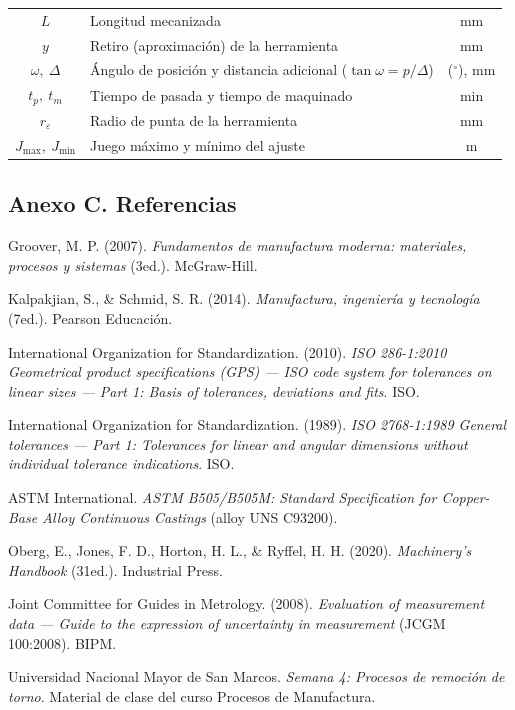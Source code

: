 \documentclass[12pt,a4paper]{article}
\begin{document}
\begin{table}[!htb]
\begin{tabularx}{\linewidth}{c X c}
		$L$                   & Longitud mecanizada                                              & mm             \\
		$y$                   & Retiro (aproximación) de la herramienta                          & mm             \\
		$\omega,\ \Delta$     & Ángulo de posición y distancia adicional ($\tan\omega=p/\Delta$) & ($^\circ$), mm \\
		$t_p,\ t_m$           & Tiempo de pasada y tiempo de maquinado                           & min            \\
		$r_\varepsilon$       & Radio de punta de la herramienta                                 & mm             \\
		$J_{\max},\ J_{\min}$ & Juego máximo y mínimo del ajuste                                 & \textmu m      \\
	\end{tabularx}
\end{table}

\subsection*{Anexo C. Referencias}

\begin{enumerate}[label={[\arabic*]},ref=\arabic*,leftmargin=2.2em,itemsep=5pt]
	\item\label{bib:groover} Groover, M. P. (2007). \emph{Fundamentos de manufactura moderna:
		      materiales, procesos y sistemas} (3\textdegree ed.). McGraw-Hill.
	\item\label{bib:kalpakjian} Kalpakjian, S., \& Schmid, S. R. (2014). \emph{Manufactura, ingeniería y
		      tecnología} (7\textdegree ed.). Pearson Educación.
	\item\label{bib:iso286} International Organization for Standardization. (2010). \emph{ISO 286-1:2010
		      Geometrical product specifications (GPS) --- ISO code system for tolerances on linear sizes
		      --- Part 1: Basis of tolerances, deviations and fits}. ISO.
	\item\label{bib:iso2768} International Organization for Standardization. (1989). \emph{ISO 2768-1:1989
		      General tolerances --- Part 1: Tolerances for linear and angular dimensions without
		      individual tolerance indications}. ISO.
	\item\label{bib:astm} ASTM International. \emph{ASTM B505/B505M: Standard Specification for
		      Copper-Base Alloy Continuous Castings} (alloy UNS C93200).
	\item\label{bib:oberg} Oberg, E., Jones, F. D., Horton, H. L., \& Ryffel, H. H. (2020).
	      \emph{Machinery's Handbook} (31\textdegree ed.). Industrial Press.
	\item\label{bib:gum} Joint Committee for Guides in Metrology. (2008). \emph{Evaluation of
		      measurement data --- Guide to the expression of uncertainty in measurement} (JCGM 100:2008).
	      BIPM.
	\item\label{bib:clase} Universidad Nacional Mayor de San Marcos. \emph{Semana 4: Procesos de
		      remoción de torno}. Material de clase del curso Procesos de Manufactura.
\end{enumerate}
\end{document}
